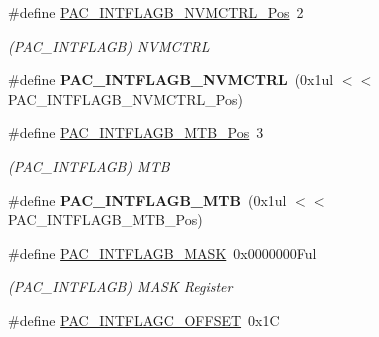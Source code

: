 \begin{DoxyCompactItemize}
\item 
\hypertarget{group___s_a_m_l21___p_a_c_gad2e15892745f7ecbb2385a50e6c362b4}{}\#define \hyperlink{group___s_a_m_l21___p_a_c_gad2e15892745f7ecbb2385a50e6c362b4}{P\+A\+C\+\_\+\+I\+N\+T\+F\+L\+A\+G\+B\+\_\+\+N\+V\+M\+C\+T\+R\+L\+\_\+\+Pos}~2\label{group___s_a_m_l21___p_a_c_gad2e15892745f7ecbb2385a50e6c362b4}

\begin{DoxyCompactList}\small\item\em (P\+A\+C\+\_\+\+I\+N\+T\+F\+L\+A\+G\+B) N\+V\+M\+C\+T\+R\+L \end{DoxyCompactList}\item 
\hypertarget{group___s_a_m_l21___p_a_c_gabf04425fd0ca8c54ca93e1c302b6fce9}{}\#define {\bfseries P\+A\+C\+\_\+\+I\+N\+T\+F\+L\+A\+G\+B\+\_\+\+N\+V\+M\+C\+T\+R\+L}~(0x1ul $<$$<$ P\+A\+C\+\_\+\+I\+N\+T\+F\+L\+A\+G\+B\+\_\+\+N\+V\+M\+C\+T\+R\+L\+\_\+\+Pos)\label{group___s_a_m_l21___p_a_c_gabf04425fd0ca8c54ca93e1c302b6fce9}

\item 
\hypertarget{group___s_a_m_l21___p_a_c_ga6954a99bab23976623d786e890112e86}{}\#define \hyperlink{group___s_a_m_l21___p_a_c_ga6954a99bab23976623d786e890112e86}{P\+A\+C\+\_\+\+I\+N\+T\+F\+L\+A\+G\+B\+\_\+\+M\+T\+B\+\_\+\+Pos}~3\label{group___s_a_m_l21___p_a_c_ga6954a99bab23976623d786e890112e86}

\begin{DoxyCompactList}\small\item\em (P\+A\+C\+\_\+\+I\+N\+T\+F\+L\+A\+G\+B) M\+T\+B \end{DoxyCompactList}\item 
\hypertarget{group___s_a_m_l21___p_a_c_ga8ae322cdf5fc0f655a3b509507059776}{}\#define {\bfseries P\+A\+C\+\_\+\+I\+N\+T\+F\+L\+A\+G\+B\+\_\+\+M\+T\+B}~(0x1ul $<$$<$ P\+A\+C\+\_\+\+I\+N\+T\+F\+L\+A\+G\+B\+\_\+\+M\+T\+B\+\_\+\+Pos)\label{group___s_a_m_l21___p_a_c_ga8ae322cdf5fc0f655a3b509507059776}

\item 
\hypertarget{group___s_a_m_l21___p_a_c_ga707b08b4a7e4c1e636e402d60cb23cdc}{}\#define \hyperlink{group___s_a_m_l21___p_a_c_ga707b08b4a7e4c1e636e402d60cb23cdc}{P\+A\+C\+\_\+\+I\+N\+T\+F\+L\+A\+G\+B\+\_\+\+M\+A\+S\+K}~0x0000000\+Ful\label{group___s_a_m_l21___p_a_c_ga707b08b4a7e4c1e636e402d60cb23cdc}

\begin{DoxyCompactList}\small\item\em (P\+A\+C\+\_\+\+I\+N\+T\+F\+L\+A\+G\+B) M\+A\+S\+K Register \end{DoxyCompactList}\item 
\hypertarget{group___s_a_m_l21___p_a_c_ga917dcc040608ffd02857a4f84194be21}{}\#define \hyperlink{group___s_a_m_l21___p_a_c_ga917dcc040608ffd02857a4f84194be21}{P\+A\+C\+\_\+\+I\+N\+T\+F\+L\+A\+G\+C\+\_\+\+O\+F\+F\+S\+E\+T}~0x1\+C\label{group___s_a_m_l21___p_a_c_ga917dcc040608ffd02857a4f84194be21}


\end{DoxyCompactItemize}
